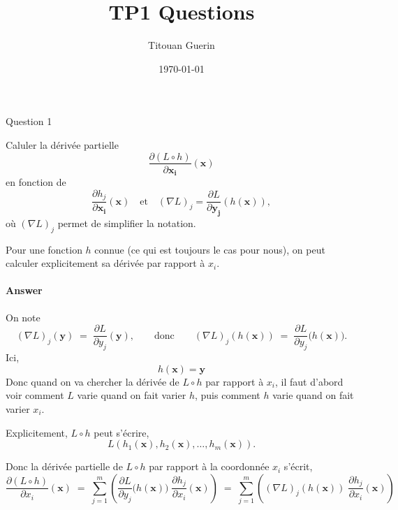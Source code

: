 \documentclass[12pt,a4paper]{article}
\title{TP1 Questions}
\author{Titouan Guerin}
\date{\today}
\begin{document}
\begin{section}{Question 1}
    
Caluler la dérivée partielle 
\[
\frac{\partial (L \circ h)}{\partial \mathbf{x_i}}(\mathbf{x})
\]
en fonction de 
\[
\frac{\partial h_j}{\partial \mathbf{x_i}}(\mathbf{x})
\quad \text{et} \quad
(\nabla L)_j = \frac{\partial L}{\partial \mathbf{y_j}}(h(\mathbf{x})),
\]
où $(\nabla L)_j$ permet de simplifier la notation. 

Pour une fonction $h$ connue (ce qui est toujours le cas pour nous), on peut calculer explicitement sa dérivée par rapport à $x_i$.

\paragraph{Answer}

On note
\[
(\nabla L)_j(\mathbf{y}) \;=\; \frac{\partial L}{\partial y_j}(\mathbf{y}),
\qquad\text{donc}\qquad
(\nabla L)_j(h(\mathbf{x})) \;=\; \frac{\partial L}{\partial y_j}\big(h(\mathbf{x})\big).
\]
Ici, \[ h(\mathbf{x}) = \mathbf{y}\]
Donc quand on va chercher la dérivée de \(L\circ h\) par rapport à \(x_i\), 
il faut d'abord voir comment \(L\) varie quand on fait varier \(h\),
puis comment \(h\) varie quand on fait varier \(x_i\).

Explicitement, \(L\circ h\) peut s'écrire,
\[
L(h_1(\mathbf{x}), h_2(\mathbf{x}), \ldots, h_m(\mathbf{x})).
\]

Donc la dérivée partielle de \(L\circ h\) par rapport à la coordonnée \(x_i\) s'écrit,
\[
\frac{\partial (L\circ h)}{\partial x_i}(\mathbf{x})
\;=\;
\sum_{j=1}^{m} \left( \frac{\partial L}{\partial y_j}\big(h(\mathbf{x})\big)\;
\frac{\partial h_j}{\partial x_i}(\mathbf{x}) \right)
\;=\;
\sum_{j=1}^{m} \left( (\nabla L)_j(h(\mathbf{x}))\; \frac{\partial h_j}{\partial x_i}(\mathbf{x}) \right)
\]

\end{section}
\end{document}

